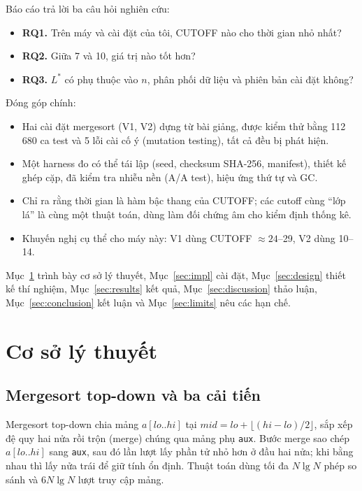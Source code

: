 \documentclass[11pt,a4paper]{article}
\begin{document}
Báo cáo trả lời ba câu hỏi nghiên cứu:
\begin{itemize}
\item \textbf{RQ1.} Trên máy và cài đặt của tôi, CUTOFF nào cho thời gian nhỏ nhất?
\item \textbf{RQ2.} Giữa 7 và 10, giá trị nào tốt hơn?
\item \textbf{RQ3.} $L^*$ có phụ thuộc vào $n$, phân phối dữ liệu và phiên bản cài đặt không?
\end{itemize}

Đóng góp chính:
\begin{itemize}
\item Hai cài đặt mergesort (V1, V2) dựng từ bài giảng, được kiểm thử bằng 112\,680 ca test
  và 5 lỗi cài cố ý (mutation testing), tất cả đều bị phát hiện.
\item Một harness đo có thể tái lập (seed, checksum SHA-256, manifest), thiết kế ghép cặp,
  đã kiểm tra nhiễu nền (A/A test), hiệu ứng thứ tự và GC.
\item Chỉ ra rằng thời gian là hàm bậc thang của CUTOFF; các cutoff cùng ``lớp lá'' là cùng một thuật toán,
  dùng làm đối chứng âm cho kiểm định thống kê.
\item Khuyến nghị cụ thể cho máy này: V1 dùng CUTOFF $\approx 24$--29, V2 dùng 10--14.
\end{itemize}
Mục~\ref{sec:theory} trình bày cơ sở lý thuyết, Mục~\ref{sec:impl} cài đặt, Mục~\ref{sec:design} thiết kế thí nghiệm, Mục~\ref{sec:results} kết quả,
Mục~\ref{sec:discussion} thảo luận, Mục~\ref{sec:conclusion} kết luận và Mục~\ref{sec:limits} nêu các hạn chế.

\section{Cơ sở lý thuyết}\label{sec:theory}

\subsection{Mergesort top-down và ba cải tiến}
Mergesort top-down chia mảng $a[lo..hi]$ tại $mid = lo + \lfloor (hi-lo)/2 \rfloor$, sắp xếp đệ quy hai nửa
rồi trộn (merge) chúng qua mảng phụ \texttt{aux}. Bước merge sao chép $a[lo..hi]$ sang
\texttt{aux}, sau đó lần lượt lấy phần tử nhỏ hơn ở đầu hai nửa; khi bằng nhau thì lấy nửa trái để giữ
tính ổn định. Thuật toán dùng tối đa $N\lg N$ phép so sánh và $6N\lg N$ lượt truy cập mảng.
\end{document}
